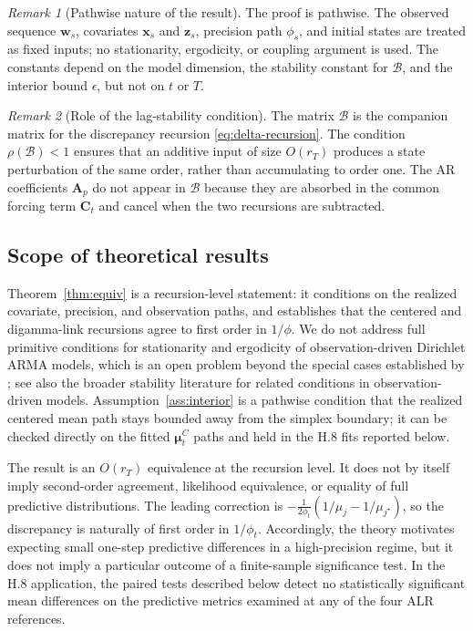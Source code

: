 \documentclass[12pt]{article}
\theoremstyle{remark}
\newtheorem*{remark}{Remark}
\newcommand{\bfmu}{\boldsymbol{\mu}}
\newcommand{\bfA}{\mathbf{A}}
\newcommand{\bfC}{\mathbf{C}}
\newcommand{\bfx}{\mathbf{x}}
\newcommand{\bfz}{\mathbf{z}}
\newcommand{\bfw}{\mathbf{w}}
\begin{document}
\begin{remark}[Pathwise nature of the result]
The proof is pathwise. The observed sequence $\bfw_s$, covariates $\bfx_s$ and $\bfz_s$, precision path $\phi_s$, and initial states are treated as fixed inputs; no stationarity, ergodicity, or coupling argument is used. The constants depend on the model dimension, the stability constant for $\mathcal{B}$, and the interior bound $\epsilon$, but not on $t$ or $T$.
\end{remark}

\begin{remark}[Role of the lag-stability condition]
The matrix $\mathcal{B}$ is the companion matrix for the discrepancy recursion \eqref{eq:delta-recursion}. The condition $\rho(\mathcal{B})<1$ ensures that an additive input of size $O(r_T)$ produces a state perturbation of the same order, rather than accumulating to order one. The AR coefficients $\bfA_p$ do not appear in $\mathcal{B}$ because they are absorbed in the common forcing term $\bfC_t$ and cancel when the two recursions are subtracted.
\end{remark}

\subsection{Scope of theoretical results}\label{sec:scope}

Theorem~\ref{thm:equiv} is a recursion-level statement: it conditions on the realized covariate, precision, and observation paths, and establishes that the centered and digamma-link recursions agree to first order in $1/\phi$. We do not address full primitive conditions for stationarity and ergodicity of observation-driven Dirichlet ARMA models, which is an open problem beyond the special cases established by \citet{zheng2017dirichlet}; see also the broader stability literature for related conditions in observation-driven models. Assumption~\ref{ass:interior} is a pathwise condition that the realized centered mean path stays bounded away from the simplex boundary; it can be checked directly on the fitted $\bfmu_t^{C}$ paths and held in the H.8 fits reported below.

The result is an $O(r_T)$ equivalence at the recursion level. It does not by itself imply second-order agreement, likelihood equivalence, or equality of full predictive distributions. The leading correction is $-\tfrac{1}{2\phi_t}(1/\mu_j-1/\mu_{j^\star})$, so the discrepancy is naturally of first order in $1/\phi_t$. Accordingly, the theory motivates expecting small one-step predictive differences in a high-precision regime, but it does not imply a particular outcome of a finite-sample significance test. In the H.8 application, the paired tests described below detect no statistically significant mean differences on the predictive metrics examined at any of the four ALR references.
\end{document}

